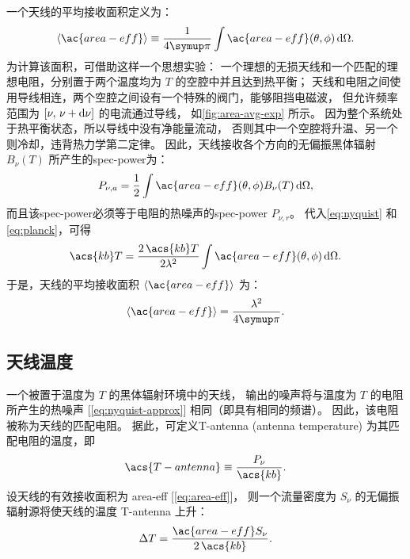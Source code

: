 一个天线的平均接收面积定义为：
\begin{equation}
  \label{eq:area-avg1}
  \langle \ac{area-eff} \rangle
    \equiv \frac{1}{4\Cpi} \int \ac{area-eff}(\theta,\phi) \,\D{\Omega} .
\end{equation}
为计算该面积，可借助这样一个思想实验：
一个理想的无损天线和一个匹配的理想电阻，分别置于两个温度均为 $T$ 的空腔中并且达到热平衡；
天线和电阻之间使用导线相连，两个空腔之间设有一个特殊的阀门，能够阻挡电磁波，
但允许频率范围为 $[\nu, \,\nu+\mathrm{d}\nu]$ 的电流通过导线，
如\autoref{fig:area-avg-exp} 所示。
因为整个系统处于热平衡状态，所以导线中没有净能量流动，
否则其中一个空腔将升温、另一个则冷却，违背热力学第二定律。
因此，天线接收各个方向的无偏振黑体辐射 $B_{\nu}(T)$ 所产生的\ac{spec-power}为：
\begin{equation}
  P_{\nu,a} =
    \frac{1}{2} \int \ac{area-eff}(\theta,\phi) B_{\nu}(T) \,\D{\Omega} ,
\end{equation}
而且该\ac{spec-power}必须等于电阻的热噪声的\ac{spec-power} $P_{\nu,r}$。
代入\autoref{eq:nyquist} 和\autoref{eq:planck}，可得
\begin{equation}
  \acs{kb}T =
    \frac{2\,\acs{kb}T}{2\lambda^2}
      \int \ac{area-eff}(\theta,\phi) \,\D{\Omega} .
\end{equation}
于是，天线的平均接收面积 $\langle \ac{area-eff} \rangle$ 为：
\begin{equation}
  \label{eq:area-avg}
  \langle \ac{area-eff} \rangle = \frac{\lambda^2}{4\Cpi} .
\end{equation}

\subsection{天线温度}

一个被置于温度为 $T$ 的黑体辐射环境中的天线，
输出的噪声将与温度为 $T$ 的电阻所产生的热噪声 [\autoref{eq:nyquist-approx}]
相同（即具有相同的频谱）。
因此，该电阻被称为天线的匹配电阻。
据此，可定义\acl{T-antenna} (antenna temperature) 为其匹配电阻的温度，即
\begin{equation}
  \label{eq:t-ant}
  \acs{T-antenna} \equiv \frac{P_{\nu}}{\acs{kb}} .
\end{equation}
设天线的有效接收面积为 \ac{area-eff} [\autoref{eq:area-eff}]，
则一个流量密度为 $S_{\nu}$ 的无偏振辐射源将使天线的温度 \acs{T-antenna} 上升：
\begin{equation}
  \label{eq:dt-source}
  \Delta T = \frac{\ac{area-eff} S_{\nu}}{2\,\acs{kb}} .
\end{equation}


